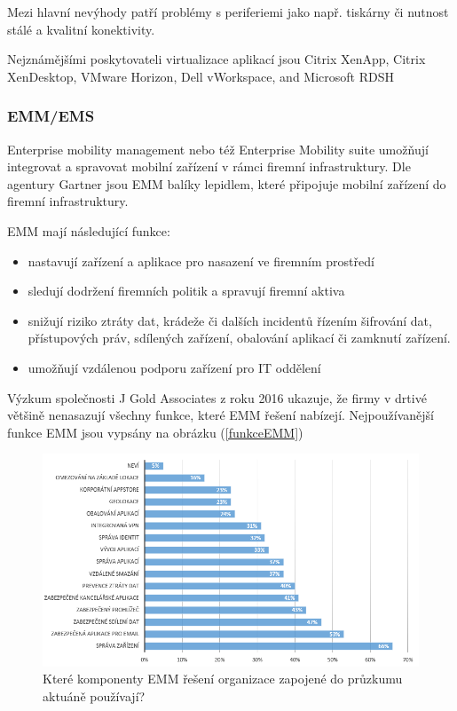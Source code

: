  Mezi hlavní nevýhody patří problémy s periferiemi jako např. tiskárny či nutnost stálé a kvalitní konektivity.
 
  Nejznámějšími poskytovateli virtualizace aplikací jsou Citrix XenApp, Citrix XenDesktop, VMware Horizon, Dell vWorkspace, and Microsoft RDSH
 
 
 \subsubsection{EMM/EMS}\label{EMM}
 Enterprise mobility management nebo též Enterprise Mobility suite umožňují integrovat a spravovat mobilní zařízení v rámci firemní infrastruktury.
 Dle agentury Gartner jsou EMM balíky lepidlem, které připojuje mobilní zařízení do firemní infrastruktury. \cite{Gartner_EMM_2016}
 
 EMM mají následující funkce:
 \begin{itemize}
     \item nastavují zařízení a aplikace pro nasazení ve firemním prostředí
     \item sledují dodržení firemních politik a spravují firemní aktiva
     \item snižují riziko ztráty dat, krádeže či dalších incidentů řízením šifrování dat, přístupových práv, sdílených zařízení, obalování aplikací či zamknutí zařízení.
     \item umožňují vzdálenou podporu zařízení pro IT oddělení
 \end{itemize}
 
Výzkum společnosti J Gold Associates z roku 2016  ukazuje, že firmy v drtivé většině nenasazují všechny funkce, které EMM řešení nabízejí. Nejpoužívanější funkce EMM jsou vypsány na obrázku (\ref{funkceEMM}) 

\begin{figure}[h!]
\centering
\includegraphics[width=13cm]{img/funkceEMM}
\caption{Které komponenty EMM řešení organizace zapojené do průzkumu aktuáně používají? } 
\end{figure}\label{funkceEMM}
 
